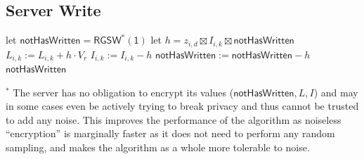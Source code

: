 \subsection{Server Write}

\begin{algorithm}
\caption{Homomorphic placing $\mathsf{HomPlacing}$}
\label{alg:spar:write}
\begin{algorithmic}[1]
    
    \State let $\mathsf{notHasWritten = \mathsf{RGSW}^*(1)}$
                \State let $h = z_{i,d}\boxtimes I_{i,k} \boxtimes \mathsf{notHasWritten}$
                \State $L_{i,k} := L_{i,k} + h\cdot V_r$
                \State $I_{i,k} := I_{i,k} - h$
                \State $\mathsf{notHasWritten} := \mathsf{notHasWritten} - h$
            \EndFor
        \EndFor
    \EndFor
    \State\Return $\mathsf{notHasWritten}$
\end{algorithmic}
\end{algorithm}

$^*$ The server has no obligation to encrypt its values ($\mathsf{notHasWritten}, L, I$) and may in some cases even be actively trying to break privacy and thus cannot be trusted to add any noise. This improves the performance of the algorithm as noiseless ``encryption'' is marginally faster as it does not need to perform any random sampling, and makes the algorithm as a whole more tolerable to noise.